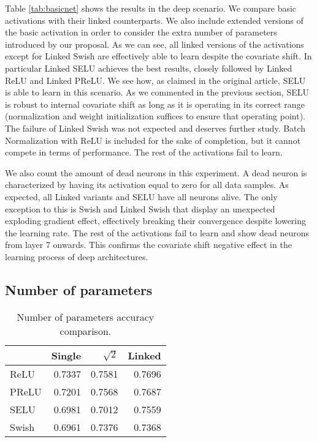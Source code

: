 \documentclass[10pt,twocolumn,letterpaper]{article}
\begin{document}
Table  \ref{tab:basicnet} shows the results in the deep scenario. We compare basic activations with their linked counterparts. We also include extended versions of the basic activation in order to consider the extra number of parameters introduced by our proposal. As we can see, all linked versions of the activations except for Linked Swish are effectively able to learn despite the covariate shift. In particular Linked SELU achieves the best results, closely followed by Linked ReLU and Linked PReLU. We see how, as claimed in the original article, SELU is able to learn in this scenario. As we commented in the previous section, SELU is robust to internal covariate shift as long as it is operating in its correct range (normalization and weight initialization suffices to ensure that operating point). The failure of Linked Swish was not expected and deserves further study. Batch Normalization with ReLU is included for the sake of completion, but it cannot compete in terms of performance. The rest of the activations fail to learn. 

We also count the amount of dead neurons in this experiment. A dead neuron is characterized by having its activation equal to zero for all data samples. As expected, all Linked variants and SELU have all neurons alive. The only exception to this is Swish and Linked Swish that display an unexpected exploding gradient effect, effectively breaking their convergence despite lowering the learning rate. The rest of the activations fail to learn and show dead neurons from layer 7 onwards. This confirms the covariate shift negative effect in the learning process of deep architectures.

\subsection{Number of parameters}

\begin{table}[h]
    \centering
    \begin{tabular}{lrrr}
\toprule{} &  Single &  $\sqrt{2}$ &  Linked \\
\midrule
ReLU  &  0.7337 &     0.7581 &  0.7696 \\
PReLU &  0.7201 &     0.7568 &  0.7687 \\
SELU  &  0.6981 &     0.7012 &  0.7559 \\
Swish &  0.6961 &     0.7376 &  0.7368 \\
\bottomrule
\end{tabular}
    
    \caption{Number of parameters accuracy comparison.}
    \label{tab:doubles}
\end{table}
\end{document}
